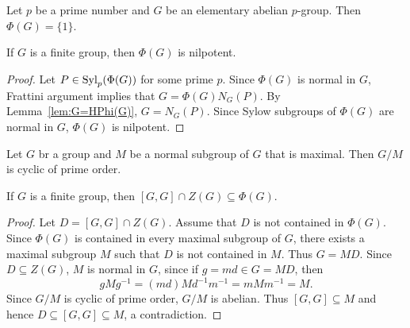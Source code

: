 \begin{exercise}
	Let $p$ be a prime number and $G$ be an elementary abelian $p$-group. Then 
	$\Phi(G)=\{1\}$.
\end{exercise}

\begin{theorem}[Frattini]
	\label{theorem:Frattini}
	If $G$ is a finite group, then $\Phi(G)$ is nilpotent. 
\end{theorem}

\begin{proof}
	Let $P\in\mathrm{Syl}_p(\Phi(G))$ for some prime $p$. Since $\Phi(G)$ is normal in
	$G$, Frattini argument implies that 
	$G=\Phi(G)N_G(P)$. By Lemma~\ref{lem:G=HPhi(G)},
	$G=N_G(P)$. Since Sylow subgroups of $\Phi(G)$ are normal in $G$,
	$\Phi(G)$ is nilpotent.
\end{proof}

\begin{exercise}
	\label{exercise:G/M}
	Let $G$ br a group and $M$ be a normal subgroup of $G$ that is maximal. Then
	$G/M$ is cyclic of prime order.
\end{exercise}


\begin{theorem}
	\label{thm:Gaschutz}
	If $G$ is a finite group, then $[G,G]\cap Z(G)\subseteq\Phi(G)$.
\end{theorem}

\begin{proof}
	Let $D=[G,G]\cap Z(G)$. Assume that $D$ is not contained in $\Phi(G)$.
	Since $\Phi(G)$ is contained in every maximal subgroup of $G$, there exists a maximal subgroup $M$ 
	such that $D$ is not contained in $M$. Thus $G=MD$. Since $D\subseteq Z(G)$, $M$ is normal in $G$, since if  
	$g=md\in G=MD$, then 
	\[
		gMg^{-1}=(md)Md^{-1}m^{-1}=mMm^{-1}=M.
	\]
	Since $G/M$ is cyclic of prime order, $G/M$ is abelian. Thus $[G,G]\subseteq M$ and hence 
	$D\subseteq [G,G]\subseteq M$, a contradiction. 
\end{proof}

